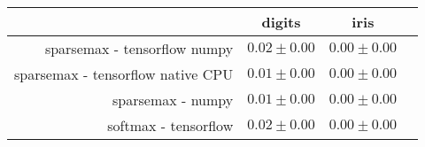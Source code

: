\begin{tabular}{r|ccc}
& digits & iris \\
\hline
sparsemax - tensorflow numpy & $0.02 \pm 0.00$ & $0.00 \pm 0.00$ \\
sparsemax - tensorflow native CPU & $0.01 \pm 0.00$ & $0.00 \pm 0.00$ \\
sparsemax - numpy & $0.01 \pm 0.00$ & $0.00 \pm 0.00$ \\
softmax - tensorflow & $0.02 \pm 0.00$ & $0.00 \pm 0.00$ \\
\end{tabular}
